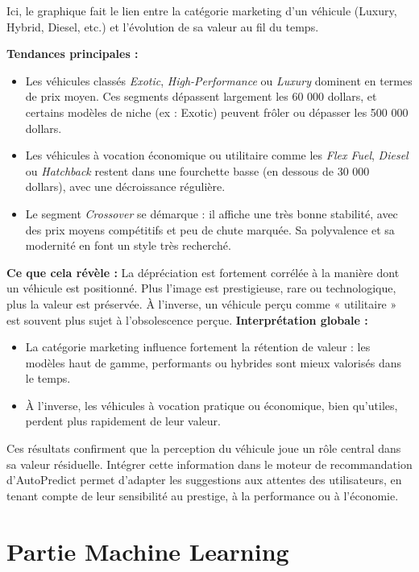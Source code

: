 \documentclass[12pt]{report}
\begin{document}
Ici, le graphique fait le lien entre la catégorie marketing d’un véhicule (Luxury, Hybrid, Diesel, etc.) et l’évolution de sa valeur au fil du temps.

\textbf{Tendances principales :} \begin{itemize} \item Les véhicules classés \textit{Exotic}, \textit{High-Performance} ou \textit{Luxury} dominent en termes de prix moyen. Ces segments dépassent largement les 60 000 dollars, et certains modèles de niche (ex : Exotic) peuvent frôler ou dépasser les 500 000 dollars. \item Les véhicules à vocation économique ou utilitaire comme les \textit{Flex Fuel}, \textit{Diesel} ou \textit{Hatchback} restent dans une fourchette basse (en dessous de 30 000 dollars), avec une décroissance régulière. \item Le segment \textit{Crossover} se démarque : il affiche une très bonne stabilité, avec des prix moyens compétitifs et peu de chute marquée. Sa polyvalence et sa modernité en font un style très recherché. \end{itemize}

\textbf{Ce que cela révèle :}
La dépréciation est fortement corrélée à la manière dont un véhicule est positionné. Plus l’image est prestigieuse, rare ou technologique, plus la valeur est préservée. À l’inverse, un véhicule perçu comme « utilitaire » est souvent plus sujet à l’obsolescence perçue.
\vspace{0.5em}
\textbf{Interprétation globale :}
\begin{itemize}
    \item La catégorie marketing influence fortement la rétention de valeur : les modèles haut de gamme, performants ou hybrides sont mieux valorisés dans le temps.
    \item À l’inverse, les véhicules à vocation pratique ou économique, bien qu’utiles, perdent plus rapidement de leur valeur.
\end{itemize}

\vspace{1em}
Ces résultats confirment que la perception du véhicule joue un rôle central dans sa valeur résiduelle. Intégrer cette information dans le moteur de recommandation d'AutoPredict permet d’adapter les suggestions aux attentes des utilisateurs, en tenant compte de leur sensibilité au prestige, à la performance ou à l’économie.

\chapter{Partie Machine Learning}
\end{document}
